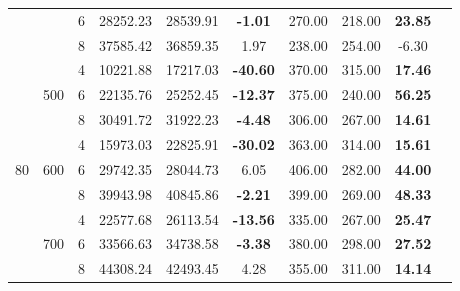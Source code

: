 \documentclass[AutoFakeBold]{LZUThesis}
\begin{document}
\begin{table}[H]
\begin{tabular}{ccc cccc ccc}
		                     &                         & 6                      & 28252.23                 & 28539.91                 & \textbf{-1.01}  & 270.00 & 218.00         & \textbf{23.85} \\
		                     &                         & 8                      & 37585.42                 & 36859.35                 & 1.97            & 238.00 & 254.00         & -6.30          \\
		\midrule
		\multirow{9}{*}{80}
		                     & \multirow{3}{*}{500}
		                     & 4                       & 10221.88               & 17217.03                 & \textbf{-40.60}          & 370.00          & 315.00 & \textbf{17.46}                  \\
		                     &                         & 6                      & 22135.76                 & 25252.45                 & \textbf{-12.37} & 375.00 & 240.00         & \textbf{56.25} \\
		                     &                         & 8                      & 30491.72                 & 31922.23                 & \textbf{-4.48}  & 306.00 & 267.00         & \textbf{14.61} \\
		\cmidrule(lr){2-9}
		                     & \multirow{3}{*}{600}
		                     & 4                       & 15973.03               & 22825.91                 & \textbf{-30.02}          & 363.00          & 314.00 & \textbf{15.61}                  \\
		                     &                         & 6                      & 29742.35                 & 28044.73                 & 6.05            & 406.00 & 282.00         & \textbf{44.00} \\
		                     &                         & 8                      & 39943.98                 & 40845.86                 & \textbf{-2.21}  & 399.00 & 269.00         & \textbf{48.33} \\
		\cmidrule(lr){2-9}
		                     & \multirow{3}{*}{700}
		                     & 4                       & 22577.68               & 26113.54                 & \textbf{-13.56}          & 335.00          & 267.00 & \textbf{25.47}                  \\
		                     &                         & 6                      & 33566.63                 & 34738.58                 & \textbf{-3.38}  & 380.00 & 298.00         & \textbf{27.52} \\
		                     &                         & 8                      & 44308.24                 & 42493.45                 & 4.28            & 355.00 & 311.00         & \textbf{14.14} \\
		\bottomrule
	\end{tabular}
	\label{tab:combined_comparison}
\end{table}
\end{document}
